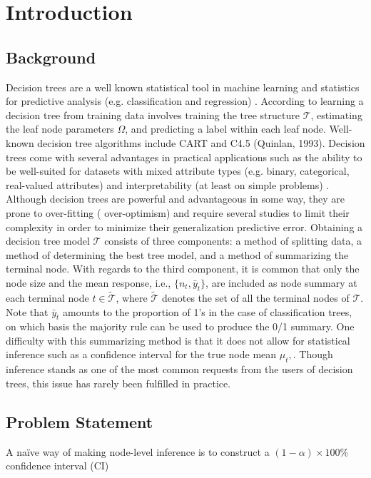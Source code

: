 
\chapter{Introduction}

\section{Background}
Decision trees are a well known statistical tool in machine learning and statistics for predictive analysis (e.g. classification and regression) \citep{lakshminarayanan2016decision}. According to \cite{lakshminarayanan2016decision} learning a decision tree from training data involves training the tree structure $\mathcal{T}$, estimating the leaf node parameters $\Omega$, and predicting a label within each leaf node. Well-known decision tree algorithms include CART \citep{breiman1984classification} and C4.5 (Quinlan, 1993). Decision trees come with several advantages in practical applications such as the ability to be well-suited for datasets with mixed attribute types (e.g. binary, categorical, real-valued attributes) and interpretability (at least on simple problems) \citep{lakshminarayanan2016decision}. Although decision trees are powerful and advantageous in some way, they are prone to over-fitting ( over-optimism) and require several studies to limit their complexity in order to minimize their generalization predictive error. Obtaining a decision tree model $\mathcal{T}$ consists of three components: a method of splitting data, a method of determining the best tree model, and a method of summarizing the terminal node. With regards to the third component, it is common that only the node size and the mean response, i.e., $\{n_t, \bar{y}_t\}$, are included as node summary at each terminal node $t \in \widetilde{\mathcal{T}}$, where $\widetilde{\mathcal{T}}$ denotes the set of all the terminal nodes of $\mathcal{T}.$ Note that $\bar{y}_t$ amounts to the proportion of 1's in the case of classification trees, on which basis the majority rule can be used to produce the 0/1 summary. One difficulty with this summarizing method is that it does not allow for statistical inference such as a confidence interval for the true node mean $\mu_t,$. Though inference stands as one of the most common requests from the users of decision trees, this issue  has rarely been fulfilled in practice. 


\section{Problem Statement}
 A na\"{i}ve way of making node-level inference is to construct a $(1-\alpha) \times 100\%$ confidence interval (CI)

